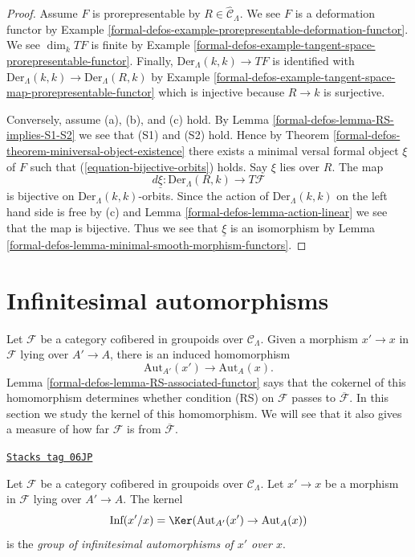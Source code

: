 \begin{proof}
Assume $F$ is prorepresentable by $R \in \widehat{\mathcal{C}}_\Lambda$.
We see $F$ is a deformation functor by
Example \ref{formal-defos-example-prorepresentable-deformation-functor}.
We see $\dim_k TF$ is finite by
Example \ref{formal-defos-example-tangent-space-prorepresentable-functor}.
Finally, $\text{Der}_\Lambda(k, k) \to TF$ is identified with
$\text{Der}_\Lambda(k, k) \to \text{Der}_\Lambda(R, k)$ by
Example \ref{formal-defos-example-tangent-space-map-prorepresentable-functor}
which is injective because $R \to k$ is surjective.

\medskip\noindent
Conversely, assume (a), (b), and (c) hold. By
Lemma \ref{formal-defos-lemma-RS-implies-S1-S2}
we see that (S1) and (S2) hold. Hence by
Theorem \ref{formal-defos-theorem-miniversal-object-existence}
there exists a minimal versal formal object $\xi$ of $F$ such that
(\ref{equation-bijective-orbits}) holds. Say $\xi$ lies over $R$.
The map
$$
d\underline{\xi} : \text{Der}_\Lambda(R, k) \to T\mathcal{F}
$$
is bijective on $\text{Der}_\Lambda(k, k)$-orbits. Since the action
of $\text{Der}_\Lambda(k, k)$ on the left hand side is free by (c) and
Lemma \ref{formal-defos-lemma-action-linear}
we see that the map is bijective. Thus we see that $\underline{\xi}$
is an isomorphism by
Lemma \ref{formal-defos-lemma-minimal-smooth-morphism-functors}.
\end{proof}

\section{Infinitesimal automorphisms}
\label{formal-defos-section-infinitesimal-automorphisms}
Let $\mathcal{F}$ be a category cofibered in groupoids over
$\mathcal{C}_\Lambda$. Given a morphism $x' \to x$ in $\mathcal{F}$ lying over
$A' \to A$, there is an induced homomorphism
$$
\text{Aut}_{A'}(x') \to \text{Aut}_A(x).
$$
Lemma \ref{formal-defos-lemma-RS-associated-functor}
says that the cokernel of this homomorphism determines whether
condition (RS) on $\mathcal{F}$ passes to $\overline{\mathcal{F}}$.
In this section we study the kernel of this homomorphism. We will see
that it also gives a measure of how far $\mathcal{F}$
is from $\overline{\mathcal{F}}$.

\begin{definition}
\label{formal-defos-definition-relative-infinitesimal-auts}
\href{https://stacks.math.columbia.edu/tag/06JP}{\texttt{Stacks tag 06JP}}

Let $\mathcal{F}$ be a category cofibered in groupoids over $\mathcal
C_\Lambda$. Let $x' \to x$ be a morphism in $\mathcal{F}$ lying over
$A' \to A$. The kernel
$$
\text{Inf}(x'/x) = \Ker(\text{Aut}_{A'}(x') \to \text{Aut}_A(x))
$$
is the {\it group of infinitesimal automorphisms of $x'$ over $x$}.
\end{definition}

